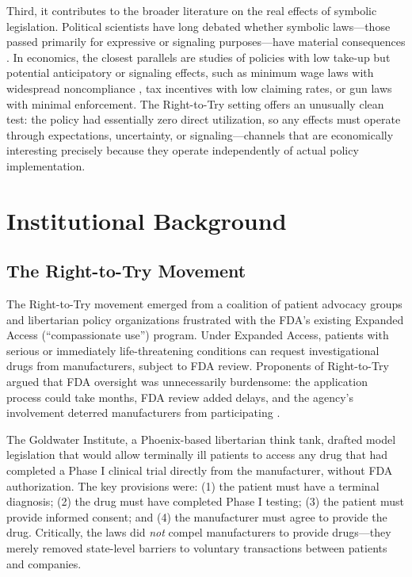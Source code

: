 \documentclass[12pt]{article}
\begin{document}
Third, it contributes to the broader literature on the real effects of symbolic legislation. Political scientists have long debated whether symbolic laws---those passed primarily for expressive or signaling purposes---have material consequences \citep{edelman1964symbolic, mayhew1974congress}. In economics, the closest parallels are studies of policies with low take-up but potential anticipatory or signaling effects, such as minimum wage laws with widespread noncompliance \citep{harasztosi2019pays}, tax incentives with low claiming rates, or gun laws with minimal enforcement. The Right-to-Try setting offers an unusually clean test: the policy had essentially zero direct utilization, so any effects must operate through expectations, uncertainty, or signaling---channels that are economically interesting precisely because they operate independently of actual policy implementation.



\section{Institutional Background}\label{sec:background}

\subsection{The Right-to-Try Movement}

The Right-to-Try movement emerged from a coalition of patient advocacy groups and libertarian policy organizations frustrated with the FDA's existing Expanded Access (``compassionate use'') program. Under Expanded Access, patients with serious or immediately life-threatening conditions can request investigational drugs from manufacturers, subject to FDA review. Proponents of Right-to-Try argued that FDA oversight was unnecessarily burdensome: the application process could take months, FDA review added delays, and the agency's involvement deterred manufacturers from participating \citep{bateman2015right}.

The Goldwater Institute, a Phoenix-based libertarian think tank, drafted model legislation that would allow terminally ill patients to access any drug that had completed a Phase I clinical trial directly from the manufacturer, without FDA authorization. The key provisions were: (1) the patient must have a terminal diagnosis; (2) the drug must have completed Phase I testing; (3) the patient must provide informed consent; and (4) the manufacturer must agree to provide the drug. Critically, the laws did \textit{not} compel manufacturers to provide drugs---they merely removed state-level barriers to voluntary transactions between patients and companies.
\end{document}
